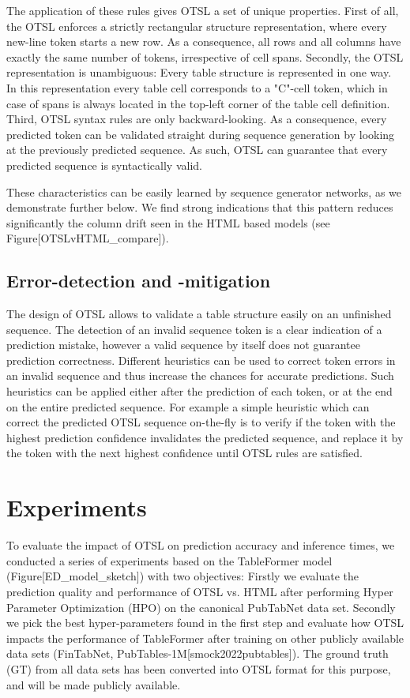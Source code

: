 \documentclass[11pt,a4paper]{article}
\begin{document}
The application of these rules gives OTSL a set of unique properties. First of all, the OTSL enforces a strictly rectangular structure representation, where every new-line token starts a new row. As a consequence, all rows and all columns have exactly the same number of tokens, irrespective of cell spans. Secondly, the OTSL representation is unambiguous: Every table structure is represented in one way. In this representation every table cell corresponds to a "C"-cell token, which in case of spans is always located in the top-left corner of the table cell definition. Third, OTSL syntax rules are only backward-looking. As a consequence, every predicted token can be validated straight during sequence generation by looking at the previously predicted sequence. As such, OTSL can guarantee that every predicted sequence is syntactically valid.

These characteristics can be easily learned by sequence generator networks, as we demonstrate further below. We find strong indications that this pattern reduces significantly the column drift seen in the HTML based models (see Figure[OTSLvHTML\_compare]).

\subsection{Error-detection and -mitigation}

The design of OTSL allows to validate a table structure easily on an unfinished sequence. The detection of an invalid sequence token is a clear indication of a prediction mistake, however a valid sequence by itself does not guarantee prediction correctness. Different heuristics can be used to correct token errors in an invalid sequence and thus increase the chances for accurate predictions. Such heuristics can be applied either after the prediction of each token, or at the end on the entire predicted sequence. For example a simple heuristic which can correct the predicted OTSL sequence on-the-fly is to verify if the token with the highest prediction confidence invalidates the predicted sequence, and replace it by the token with the next highest confidence until OTSL rules are satisfied.

\section{Experiments}

To evaluate the impact of OTSL on prediction accuracy and inference times, we conducted a series of experiments based on the TableFormer model (Figure[ED\_model\_sketch]) with two objectives: Firstly we evaluate the prediction quality and performance of OTSL vs. HTML after performing Hyper Parameter Optimization (HPO) on the canonical PubTabNet data set. Secondly we pick the best hyper-parameters found in the first step and evaluate how OTSL impacts the performance of TableFormer after training on other publicly available data sets (FinTabNet, PubTables-1M[smock2022pubtables]). The ground truth (GT) from all data sets has been converted into OTSL format for this purpose, and will be made publicly available.
\end{document}
